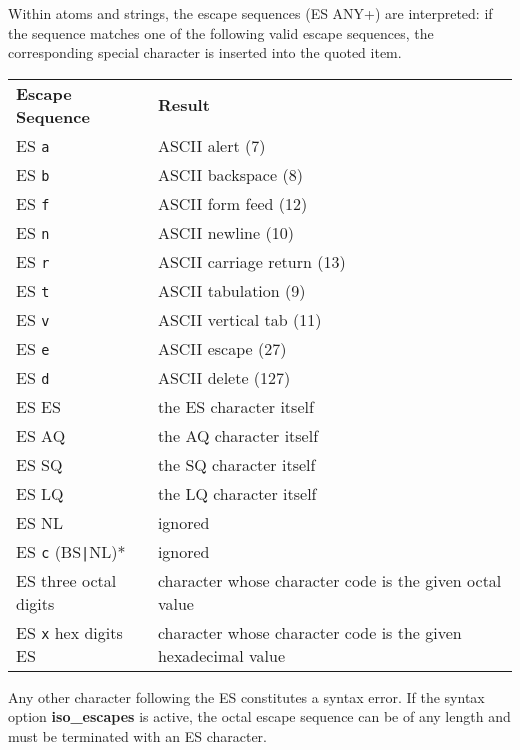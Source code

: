 Within atoms and strings, the escape sequences (ES ANY+) are interpreted:
if the sequence matches one of the following valid escape sequences,
the corresponding special character is inserted into the quoted item.
\begin{flushleft}
\begin{tabular}{ll} 
{\bf Escape Sequence}	&	{\bf Result} \\
ES \verb'a'		&	ASCII alert (7)\\
ES \verb'b'		&	ASCII backspace (8)\\
ES \verb'f'		&	ASCII form feed (12)\\
ES \verb'n'		&	ASCII newline (10)\\
ES \verb'r'		&	ASCII carriage return (13)\\
ES \verb't'		&	ASCII tabulation (9)\\
ES \verb'v'		&	ASCII vertical tab (11)\\
ES \verb'e'		&	ASCII escape (27)\\
ES \verb'd'		&	ASCII delete (127)\\
ES ES			&	the ES character itself\\
ES AQ			&	the AQ character itself\\
ES SQ			&	the SQ character itself\\
ES LQ			&	the LQ character itself\\
ES NL			&	ignored\\
ES \verb'c' (BS\verb'|'NL)*	&	ignored\\
ES three octal digits	&	character whose character code is
the given octal value\\
ES \verb'x' hex digits ES	&    character whose character code is
the given hexadecimal value\\
\end{tabular}
\end{flushleft}
Any other character following the ES constitutes a syntax error.
If the syntax option {\bf iso_escapes} is active, the octal escape
sequence can be of any length and must be terminated with an ES character.



